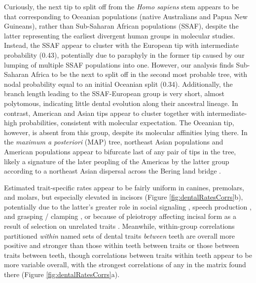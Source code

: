 \documentclass[10pt, twocolumn, twoside]{article}
\begin{document}
Curiously, the next tip to split off from the \textit{Homo sapiens} stem appears to be that corresponding to Oceanian populations (native Australians and Papua New Guineans), rather than Sub-Saharan African populations (SSAF), despite the latter representing the earliest divergent human groups in molecular studies. Instead, the SSAF appear to cluster with the European tip with intermediate probability (0.43), potentially due to paraphyly in the former tip caused by our lumping of multiple SSAF populations into one. However, our analysis finds Sub-Saharan Africa to be the next to split off in the second most probable tree, with nodal probability equal to an initial Oceanian split (0.34). Additionally, the branch length leading to the SSAF-European group is very short, almost polytomous, indicating little dental evolution along their ancestral lineage. In contrast, American and Asian tips appear to cluster together with intermediate-high probabilities, consistent with molecular expectation. The Oceanian tip, however, is absent from this group, despite its molecular affinities lying there. In the \textit{maximum a posteriori} (MAP) tree, northeast Asian populations and American populations appear to bifurcate last of any pair of tips in the tree, likely a signature of the later peopling of the Americas by the latter group according to a northeast Asian dispersal across the Bering land bridge \citep{mulliganPeoplingAmericasOrigin2017}.

Estimated trait-specific rates appear to be fairly uniform in canines, premolars, and molars, but especially elevated in incisors (Figure \ref{fig:dentalRatesCorrs}b), potentially due to the latter's greater role in social signaling \citep{demirSmileDentalAesthetics2017}, speech production \citep{howellVariationSizeShape1987}, and grasping / clamping \citep{trinkausNeandertalFaceEvolutionary1987}, or because of pleiotropy affecting incisal form as a result of selection on unrelated traits \citep{hluskoEnvironmentalSelectionLast2018}. Meanwhile, within-group correlations partitioned \textit{within} named sets of dental traits \textit{between} teeth are overall more positive and stronger than those within teeth between traits or those between traits between teeth, though correlations between traits within teeth appear to be more variable overall, with the strongest correlations of any in the matrix found there (Figure \ref{fig:dentalRatesCorrs}a). 
\end{document}
